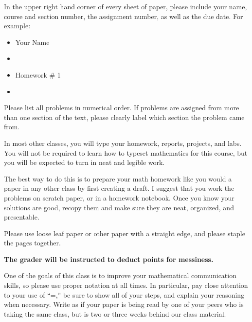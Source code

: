 \begin{description}[leftmargin=0in,itemsep=10pt]
    
\item[\textbf{Heading:}]  In the upper right hand corner of every sheet of paper, please include your name, course and section number, the assignment number, as well as the due date.  For example:

\begin{itemize}
	\item[] Your Name
	\item[] \Class
	\item[] Homework \# 1
	\item[] \FirstDue
\end{itemize}

\item[\textbf{Numbering:}] Please list all problems in numerical order.  If problems are assigned from more than one section of the text, please clearly label which section the problem came from.

\item[\textbf{Neatness:}] 
In most other classes, you will type your homework, reports, projects, and labs.  You will not be required to learn how to typeset mathematics for this course, but you will be expected to turn in neat and legible work.  %

The best way to do this is to prepare your math homework like you would a paper in any other class by first creating a draft.  
I suggest that you work the problems on scratch paper, or in a homework notebook.  Once you know your solutions are good, recopy them and make sure they are neat, organized, and presentable.

Please use loose leaf paper or other paper with a straight edge, and please staple the pages together. %

\textbf{The grader will be instructed to deduct points for messiness.}

\item[\textbf{Showing Work:}]  
One of the goals of this class is to improve your mathematical communication skills, so please use proper notation at all times. In particular, pay close attention to your use of ``=,'' be sure to show all of your steps, and explain your reasoning when necessary.
Write as if your paper is being read by one of your peers who is taking the same class, but is two or three weeks behind our class material. 


\end{description}
